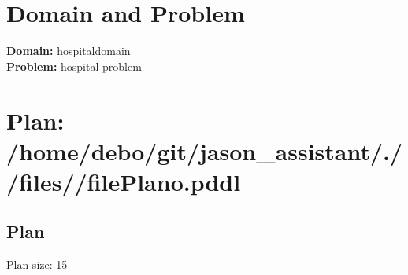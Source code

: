 \documentclass[a4paper,12pt]{article}
\author{\mbox{\sc {\sc Val}}}
\begin{document}
 \maketitle 
\section{Domain and Problem}
{\bf Domain:} hospitaldomain\\
{\bf Problem:} hospital-problem
\section{\sloppy Plan: /\-home/\-debo/\-git/\-jason\_assistant/\-./\-/\-files/\-/\-filePlano.pddl}
\subsection{Plan}
Plan size: 15
\end{document}
